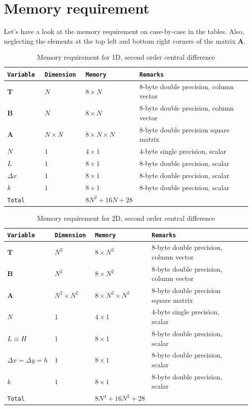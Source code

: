 \documentclass[12pt]{amsart}   %
\begin{document}
\section{Memory requirement}
Let's have a look at the memory requirement on case-by-case in the tables. Also, neglecting the elements at the top left and bottom right corners of the matrix \textbf{A}.
\begin{table}[htbp!] \caption{Memory requirement for 1D, second order central difference}
\begin{tabular}{lllll}
\tt{Variable} & \tt{Dimension} & \tt{Memory} & \tt{Remarks}  \\
\hline
 $\textbf{T}$ & $N$ & $8\times N$ & 8-byte double precision, column vector \\
 $\textbf{B}$ & $N$ & $8\times N$ & 8-byte double precision, column vector \\
 $\textbf{A}$ & $N \times N$ & $8 \times N \times N$ & 8-byte double precision square matrix\\
 $N$ & $1$ & $4 \times1$ & 4-byte single precision, scalar \\
 $L$ & $1$ & $8 \times1$ & 8-byte double precision, scalar\\
 $\Delta x$ & $1$ & $8 \times 1$ & 8-byte double precision, scalar\\
 $k$ & $1$ & $8 \times 1$ & 8-byte double precision, scalar\\
 \hline
 \tt{Total} & & $8 N^2 +16N + 28 $ & \\
\end{tabular}
\end{table}

\begin{table}[htbp!] \caption{Memory requirement for 2D, second order central difference}
\hspace{-3cm}
\begin{tabular}{lllll}
\tt{Variable} & \tt{Dimension} & \tt{Memory} & \tt{Remarks}  \\
\hline
 $\textbf{T}$ & $N^2$ & $8\times N^2$ & 8-byte double precision, column vector \\
 $\textbf{B}$ & $N^2$ & $8\times N^2$ & 8-byte double precision, column vector \\
 $\textbf{A}$ & $N^2 \times N^2$ & $8 \times N^2 \times N^2$ & 8-byte double precision square matrix \\
 $N$ & $1$ & $4 \times1$ & 4-byte single precision, scalar \\
 $L\equiv H$ & $1$ & $8 \times1$ & 8-byte double precision, scalar\\
 $\Delta x=\Delta y =h$ & $1$ & $8 \times 1$ & 8-byte double precision, scalar\\
 $k$ & $1$ & $8 \times 1$ & 8-byte double precision, scalar\\
 \hline
 \tt{Total} & & $8N^4 + 16N^2+28 $ & \\
\end{tabular}
\end{table}
\end{document}
